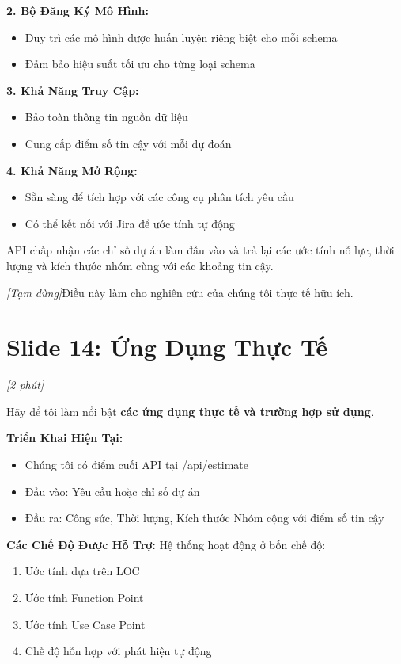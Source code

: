 \documentclass[12pt,a4paper]{article}
\newcommand{\slide}[1]{\section*{\textcolor{slidenum}{Slide #1}}}
\newcommand{\timing}[1]{\textcolor{timing}{\textit{[#1]}}}
\newcommand{\keypoint}[1]{\textcolor{keypoint}{\textbf{#1}}}
\newcommand{\pause}{\textit{[Tạm dừng]}}
\begin{document}
\textbf{2. Bộ Đăng Ký Mô Hình:}
\begin{itemize}
    \item Duy trì các mô hình được huấn luyện riêng biệt cho mỗi schema
    \item Đảm bảo hiệu suất tối ưu cho từng loại schema
\end{itemize}

\textbf{3. Khả Năng Truy Cập:}
\begin{itemize}
    \item Bảo toàn thông tin nguồn dữ liệu
    \item Cung cấp điểm số tin cậy với mỗi dự đoán
\end{itemize}

\textbf{4. Khả Năng Mở Rộng:}
\begin{itemize}
    \item Sẵn sàng để tích hợp với các công cụ phân tích yêu cầu
    \item Có thể kết nối với Jira để ước tính tự động
\end{itemize}

API chấp nhận các chỉ số dự án làm đầu vào và trả lại các ước tính nỗ lực, thời lượng và kích thước nhóm cùng với các khoảng tin cậy.

\pause Điều này làm cho nghiên cứu của chúng tôi thực tế hữu ích.

\slide{14: Ứng Dụng Thực Tế}
\timing{2 phút}

Hãy để tôi làm nổi bật \keypoint{các ứng dụng thực tế và trường hợp sử dụng}.

\textbf{Triển Khai Hiện Tại:}
\begin{itemize}
    \item Chúng tôi có điểm cuối API tại /api/estimate
    \item Đầu vào: Yêu cầu hoặc chỉ số dự án
    \item Đầu ra: Công sức, Thời lượng, Kích thước Nhóm cộng với điểm số tin cậy
\end{itemize}

\textbf{Các Chế Độ Được Hỗ Trợ:}
Hệ thống hoạt động ở bốn chế độ:
\begin{enumerate}
    \item Ước tính dựa trên LOC
    \item Ước tính Function Point
    \item Ước tính Use Case Point
    \item Chế độ hỗn hợp với phát hiện tự động
\end{enumerate}
\end{document}
